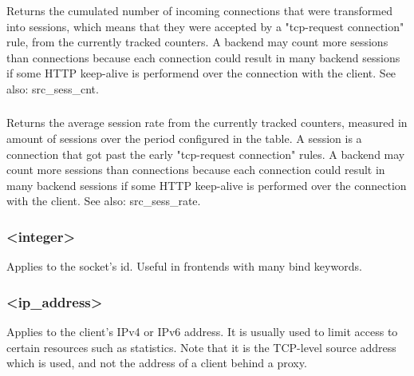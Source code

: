 \subsubsection[sc1\_sess\_cnt]{}
\subsubsection[sc2\_sess\_cnt]{}
  Returns the cumulated number of incoming connections that were transformed
  into sessions, which means that they were accepted by a "tcp-request
  connection" rule, from the currently tracked counters. A backend may count
  more sessions than connections because each connection could result in many
  backend sessions if some HTTP keep-alive is performend over the connection
  with the client. See also: src\_sess\_cnt.

\subsubsection[sc1\_sess\_rate]{}
\subsubsection[sc2\_sess\_rate]{}
  Returns the average session rate from the currently tracked counters,
  measured in amount of sessions over the period configured in the table. A
  session is a connection that got past the early "tcp-request connection"
  rules. A backend may count more sessions than connections because each
  connection could result in many backend sessions if some HTTP keep-alive is
  performed over the connection with the client. See also: src\_sess\_rate.

\subsubsection[so\_id]{ <integer>}
  Applies to the socket's id. Useful in frontends with many bind keywords.

\subsubsection[src]{ <ip\_address>}
  Applies to the client's IPv4 or IPv6 address. It is usually used to limit
  access to certain resources such as statistics. Note that it is the TCP-level
  source address which is used, and not the address of a client behind a proxy.

